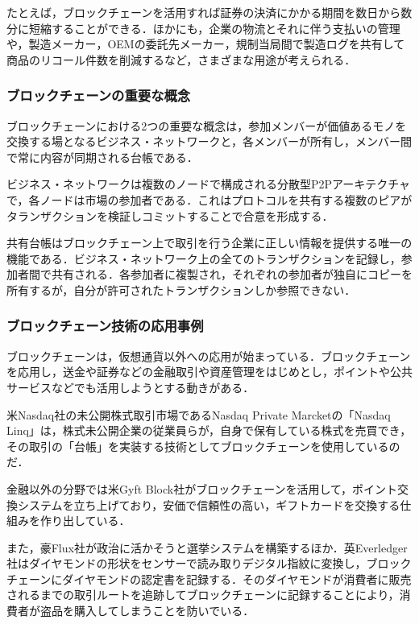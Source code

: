 たとえば，ブロックチェーンを活用すれば証券の決済にかかる期間を数日から数分に短縮することができる．ほかにも，企業の物流とそれに伴う支払いの管理や，製造メーカー，OEMの委託先メーカー，規制当局間で製造ログを共有して商品のリコール件数を削減するなど，さまざまな用途が考えられる．

\subsubsection{ブロックチェーンの重要な概念}

ブロックチェーンにおける2つの重要な概念は，参加メンバーが価値あるモノを交換する場となるビジネス・ネットワークと，各メンバーが所有し，メンバー間で常に内容が同期される台帳である．

ビジネス・ネットワークは複数のノードで構成される分散型P2Pアーキテクチャで，各ノードは市場の参加者である．これはプロトコルを共有する複数のピアがタランザクションを検証しコミットすることで合意を形成する．

共有台帳はブロックチェーン上で取引を行う企業に正しい情報を提供する唯一の機能である．ビジネス・ネットワーク上の全てのトランザクションを記録し，参加者間で共有される．各参加者に複製され，それぞれの参加者が独自にコピーを所有するが，自分が許可されたトランザクションしか参照できない．

\newpage

\subsubsection{ブロックチェーン技術の応用事例}

ブロックチェーンは，仮想通貨以外への応用が始まっている．ブロックチェーンを応用し，送金や証券などの金融取引や資産管理をはじめとし，ポイントや公共サービスなどでも活用しようとする動きがある．

米Nasdaq社の未公開株式取引市場であるNasdaq Private Marcketの「Nasdaq Linq」は，株式未公開企業の従業員らが，自身で保有している株式を売買でき，その取引の「台帳」を実装する技術としてブロックチェーンを使用しているのだ．

金融以外の分野では米Gyft Block社がブロックチェーンを活用して，ポイント交換システムを立ち上げており，安価で信頼性の高い，ギフトカードを交換する仕組みを作り出している．

また，豪Flux社が政治に活かそうと選挙システムを構築するほか．英Everledger社はダイヤモンドの形状をセンサーで読み取りデジタル指紋に変換し，ブロックチェーンにダイヤモンドの認定書を記録する．そのダイヤモンドが消費者に販売されるまでの取引ルートを追跡してブロックチェーンに記録することにより，消費者が盗品を購入してしまうことを防いでいる．

